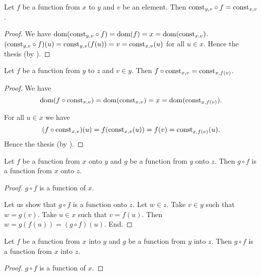 \documentclass[../../set-theory.ftl.tex]{subfiles}
\begin{document}
\begin{forthel}
    \begin{proposition}\label{SetTheory_02_01_558108}
      Let $f$ be a function from $x$ to $y$ and $v$ be an element.
      Then $\mbox{const}_{y,v} \circ f = \mbox{const}_{x,v}$.
    \end{proposition}
    \begin{proof}
      We have $\operatorname{dom}(\mbox{const}_{y,v} \circ f) = \operatorname{dom}(f) = x = \operatorname{dom}(\mbox{const}_{x,v})$.
      $(\mbox{const}_{y,v} \circ f)(u) = \mbox{const}_{y,v}(f(u)) = v = \mbox{const}_{x,v}(u)$ for all $u \in x$.
      Hence the thesis (by ).
    \end{proof}

    \begin{proposition}\label{SetTheory_02_01_795869}
      Let $f$ be a function from $y$ to $z$ and $v \in y$.
      Then $f \circ \mbox{const}_{x,v} = \mbox{const}_{x,f(v)}$.
    \end{proposition}
    \begin{proof}
      We have
      \[  \operatorname{dom}(f \circ \mbox{const}_{x,v})
          = \operatorname{dom}(\mbox{const}_{x,v})
          = x
          = \operatorname{dom}(\mbox{const}_{x,f(v)}). \]

      For all $u \in x$ we have
      \[  (f \circ \mbox{const}_{x,v})(u)
          = f(\mbox{const}_{x,v}(u))
          = f(v)
          = \mbox{const}_{x,f(v)}(u). \]
      Hence the thesis (by ).
    \end{proof}

    \begin{proposition}\label{SetTheory_02_01_205975}
      Let $f$ be a function from $x$ onto $y$ and $g$ be a function from $y$ onto $z$.
      Then $g \circ f$ is a function from $x$ onto $z$.
    \end{proposition}
    \begin{proof}
      $g \circ f$ is a function of $x$.

      Let us show that $g \circ f$ is a function onto $z$.
        Let $w \in z$.
        Take $v \in y$ such that $w = g(v)$.
        Take $u \in x$ such that $v = f(u)$.
        Then $w = g(f(u)) = (g \circ f)(u)$.
      End.
    \end{proof}

    \begin{proposition}\label{SetTheory_02_01_784576}
      Let $f$ be a function from $x$ into $y$ and $g$ be a function from $y$ into $z$.
      Then $g \circ f$ is a function from $x$ into $z$.
    \end{proposition}
    \begin{proof}
      $g \circ f$ is a function of $x$.


\end{proof}
\end{forthel}
\end{document}
